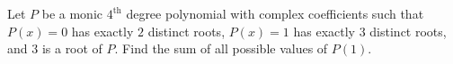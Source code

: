 Let $P$ be a monic $4^\text{th}$ degree polynomial with complex coefficients such that $P(x)=0$ has exactly $2$ distinct roots, $P(x)=1$ has exactly $3$ distinct roots, and $3$ is a root of $P$. Find the sum of all possible values of $P(1)$.
